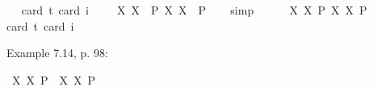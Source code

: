 \begin{isabellebody}
\ \ \isamarkupfalse%
{\isacharbrackleft}card\ {\isacharprime}t{\isacharequal}{}{\isacharcomma}\ card\ i{\isacharequal}{}{\isacharbrackright}%
\ %
%
\isamarkupfalse%
\ %
%
%
%
\isanewline
{}\isamarkupfalse%
\ {\isachardoublequoteopen}{\isasymlfloor}{\isacharparenleft}{\isasymlambda}X{\isachardot}\ \isactrlbold {\isasymdiamond}\isactrlbold {\isasymexists}X{\isacharparenright}\ \ {\isacharparenleft}P{\isacharcolon}{\isacharcolon}{\isasymup}{\isasymlangle}{\isasymup}{\isasymlangle}{\isasymzero}{\isasymrangle}{\isasymrangle}{\isacharparenright}\isactrlbold {\isasymrightarrow}\ \isactrlbold {\isasymdiamond}{\isacharparenleft}{\isacharparenleft}{\isasymlambda}X{\isachardot}\ \isactrlbold {\isasymexists}X{\isacharparenright}\ \ P{\isacharparenright}{\isasymrfloor}{\isachardoublequoteclose}%
\ \ %
%
\isamarkupfalse%
\ simp%
%
%
\ \ \ \ \isanewline
{}\isamarkupfalse%
\ {\isachardoublequoteopen}{\isasymlfloor}{\isacharparenleft}{\isasymlambda}X{\isachardot}\ \isactrlbold {\isasymdiamond}\isactrlbold {\isasymexists}X{\isacharparenright}\ \isactrlbold {\isasymdown}{\isacharparenleft}P{\isacharcolon}{\isacharcolon}{\isasymup}{\isasymlangle}{\isasymup}{\isasymlangle}{\isasymzero}{\isasymrangle}{\isasymrangle}{\isacharparenright}\isactrlbold {\isasymrightarrow}\ \isactrlbold {\isasymdiamond}{\isacharparenleft}{\isacharparenleft}{\isasymlambda}X{\isachardot}\ \isactrlbold {\isasymexists}X{\isacharparenright}\ \isactrlbold {\isasymdown}P{\isacharparenright}{\isasymrfloor}{\isachardoublequoteclose}\ \isanewline
\ \ \isamarkupfalse%
{\isacharbrackleft}card\ {\isacharprime}t{\isacharequal}{}{\isacharcomma}\ card\ i{\isacharequal}{}{\isacharbrackright}%
\ %
%
\isamarkupfalse%
\ %
%
%
%
%
\begin{isamarkuptext}%
Example 7.14, p. 98:%
\end{isamarkuptext}\isamarkuptrue%
\isamarkupfalse%
\ {\isachardoublequoteopen}{\isasymlfloor}{\isacharparenleft}{\isasymlambda}X{\isachardot}\ \isactrlbold {\isasymdiamond}\isactrlbold {\isasymexists}X{\isacharparenright}\ \isactrlbold {\isasymdown}{\isacharparenleft}P{\isacharcolon}{\isacharcolon}{\isasymup}{\isasymlangle}{\isasymzero}{\isasymrangle}{\isacharparenright}\ \isactrlbold {\isasymrightarrow}\ {\isacharparenleft}{\isasymlambda}X{\isachardot}\ \isactrlbold {\isasymexists}X{\isacharparenright}\ \isactrlbold {\isasymdown}P{\isasymrfloor}{\isachardoublequoteclose}%

\end{isabellebody}
